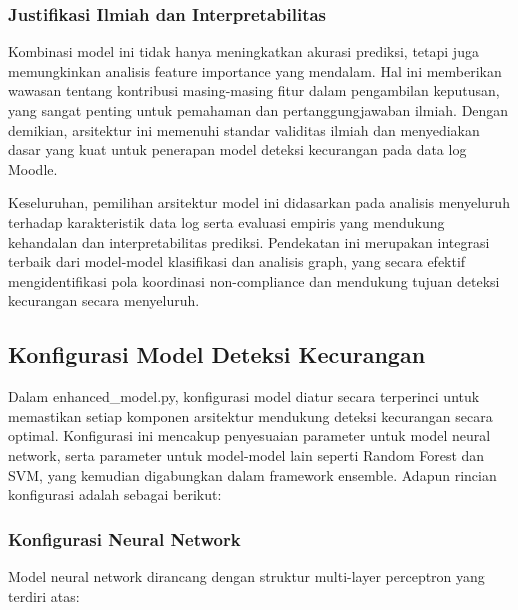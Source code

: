\subsubsection{Justifikasi Ilmiah dan Interpretabilitas}
Kombinasi model ini tidak hanya meningkatkan akurasi prediksi, tetapi juga memungkinkan analisis feature importance yang mendalam. Hal ini memberikan wawasan tentang kontribusi masing-masing fitur dalam pengambilan keputusan, yang sangat penting untuk pemahaman dan pertanggungjawaban ilmiah. Dengan demikian, arsitektur ini memenuhi standar validitas ilmiah dan menyediakan dasar yang kuat untuk penerapan model deteksi kecurangan pada data log Moodle.

Keseluruhan, pemilihan arsitektur model ini didasarkan pada analisis menyeluruh terhadap karakteristik data log serta evaluasi empiris yang mendukung kehandalan dan interpretabilitas prediksi. Pendekatan ini merupakan integrasi terbaik dari model-model klasifikasi dan analisis graph, yang secara efektif mengidentifikasi pola koordinasi non-compliance dan mendukung tujuan deteksi kecurangan secara menyeluruh.

\subsection{Konfigurasi Model Deteksi Kecurangan}
\label{subsec:konfigurasiModel}

Dalam enhanced\_model.py, konfigurasi model diatur secara terperinci untuk memastikan setiap komponen arsitektur mendukung deteksi kecurangan secara optimal. Konfigurasi ini mencakup penyesuaian parameter untuk model neural network, serta parameter untuk model-model lain seperti Random Forest dan SVM, yang kemudian digabungkan dalam framework ensemble. Adapun rincian konfigurasi adalah sebagai berikut:

\subsubsection{Konfigurasi Neural Network}
Model neural network dirancang dengan struktur multi-layer perceptron yang terdiri atas:

